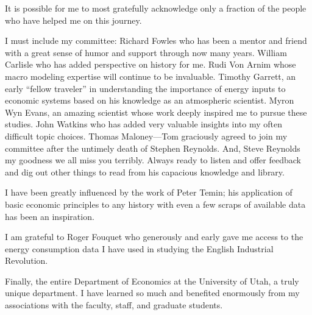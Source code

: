 \iffalse
{\footnotesize\em This page is optional.
It's in the table of contents and it's labeled 'ACKNOWLEDGMENTS' even
though the spelling `ACKNOWLEDGEMENTS' is also correct.
This page should be at the end of the preface, if one exists, or a
separate page, if no preface is used.}
\fi

\iffalse
Recognize faculty, friends, family but not the typist, editor or persons
paid to produce the manuscript from draft copy. Recognize funding,
special permission to reproduce figures and copyrighted material.
\fi

	It is possible for me to most gratefully acknowledge only a fraction of the people who have helped me on this journey.
	
	I must include my committee: Richard Fowles who has been a mentor and friend with a great sense of humor and support through now many years. William Carlisle who has added perspective on history for me. Rudi Von Arnim whose macro modeling expertise will continue to be invaluable. Timothy Garrett, an early ``fellow traveler'' in understanding the importance of energy inputs to economic systems based on his knowledge as an atmospheric scientist. Myron Wyn Evans, an amazing scientist whose work deeply inspired me to pursue these studies. John Watkins who has added very valuable insights into my often difficult topic choices. Thomas Maloney---Tom graciously agreed to join my committee after the untimely death of Stephen Reynolds. And, Steve Reynolds my goodness we all miss you terribly. Always ready to listen and offer feedback and dig out other things to read from his capacious knowledge and library.
	
	I have been greatly influenced by the work of Peter Temin; his application of basic economic principles to any history with even a few scraps of available data has been an inspiration.
	
	I am grateful to Roger Fouquet who generously and early gave me access to the energy consumption data I have used in studying the English Industrial Revolution.
	
	Finally, the entire Department of Economics at the University of Utah, a truly unique department. I have learned so much and benefited enormously from my associations with the faculty, staff, and graduate students.